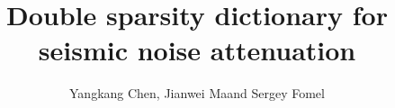 \title{Double sparsity dictionary for seismic noise attenuation}
\maketitle

\renewcommand{\thefootnote}{\fnsymbol{footnote}}
\author{Yangkang Chen\footnotemark[1], Jianwei Ma\footnotemark[2] and Sergey Fomel\footnotemark[1]}


\address{
\footnotemark[1]Bureau of Economic Geology \\
John A. and Katherine G. Jackson School of Geosciences \\
The University of Texas at Austin \\
University Station, Box X \\
Austin, TX 78713-8924 \\
ykchen@utexas.edu \& sergey.fomel@beg.utexas.edu \\
\footnotemark[2] Department of Mathematics \\
Harbin Institute of Technology \\
Harbin, China \\
jma@hit.edu.cn
}

\DeclareRobustCommand{\dlo}[1]{\ifthenelse{\boolean{@revd}}{}{}}
\DeclareRobustCommand{\wen}[1]{%
  \ifthenelse{\boolean{@revd}}{\textcolor{black}{#1}}{#1}}
  

